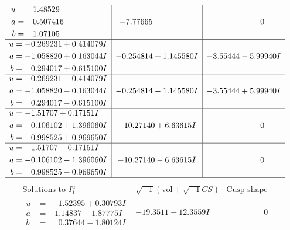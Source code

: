 \documentclass[1p]{elsarticle_modified}
\theoremstyle{definition}
\newcommand{\I}{\sqrt{-1}}
\begin{document}
$$\begin{array}{c|c|c}
\begin{aligned}
u &= \phantom{-}1.48529\phantom{ +0.000000I} \\
a &= \phantom{-}0.507416\phantom{ +0.000000I} \\
b &= \phantom{-}1.07105\phantom{ +0.000000I}\end{aligned}
 & -7.77665\phantom{ +0.000000I} & \phantom{-0.000000 } 0 \\ \hline\begin{aligned}
u &= -0.269231 + 0.414079 I \\
a &= -1.058820 + 0.163044 I \\
b &= \phantom{-}0.294017 + 0.615100 I\end{aligned}
 & -0.254814 + 1.145580 I & -3.55444 - 5.99940 I \\ \hline\begin{aligned}
u &= -0.269231 - 0.414079 I \\
a &= -1.058820 - 0.163044 I \\
b &= \phantom{-}0.294017 - 0.615100 I\end{aligned}
 & -0.254814 - 1.145580 I & -3.55444 + 5.99940 I \\ \hline\begin{aligned}
u &= -1.51707 + 0.17151 I \\
a &= -0.106102 + 1.396060 I \\
b &= \phantom{-}0.998525 + 0.969650 I\end{aligned}
 & -10.27140 + 6.63615 I & \phantom{-0.000000 } 0 \\ \hline\begin{aligned}
u &= -1.51707 - 0.17151 I \\
a &= -0.106102 - 1.396060 I \\
b &= \phantom{-}0.998525 - 0.969650 I\end{aligned}
 & -10.27140 - 6.63615 I & \phantom{-0.000000 } 0\\
 \hline 
 \end{array}$$\newpage$$\begin{array}{c|c|c}  
\text{Solutions to }I^u_{1}& \I (\text{vol} + \sqrt{-1}CS) & \text{Cusp shape}\\
 \hline 
\begin{aligned}
u &= \phantom{-}1.52395 + 0.30793 I \\
a &= -1.14837 - 1.87775 I \\
b &= \phantom{-}0.37644 - 1.80124 I\end{aligned}
 & -19.3511 - 12.3559 I & \phantom{-0.000000 } 0 \\ \hline\begin{aligned}

\end{aligned}
\end{array}$$
\end{document}
